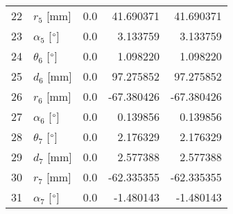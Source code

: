 \documentclass{standalone}%
\begin{document}
\begin{tabular}{llrrr}
22 &              $r_{5}$ [mm] &      0.0 &   41.690371 &   41.690371 \\
23 &  $\alpha_{5}$ [$\degree$] &      0.0 &    3.133759 &    3.133759 \\
24 &  $\theta_{6}$ [$\degree$] &      0.0 &    1.098220 &    1.098220 \\
25 &              $d_{6}$ [mm] &      0.0 &   97.275852 &   97.275852 \\
26 &              $r_{6}$ [mm] &      0.0 &  -67.380426 &  -67.380426 \\
27 &  $\alpha_{6}$ [$\degree$] &      0.0 &    0.139856 &    0.139856 \\
28 &  $\theta_{7}$ [$\degree$] &      0.0 &    2.176329 &    2.176329 \\
29 &              $d_{7}$ [mm] &      0.0 &    2.577388 &    2.577388 \\
30 &              $r_{7}$ [mm] &      0.0 &  -62.335355 &  -62.335355 \\
31 &  $\alpha_{7}$ [$\degree$] &      0.0 &   -1.480143 &   -1.480143 \\
\bottomrule
\end{tabular}
%
\end{document}
